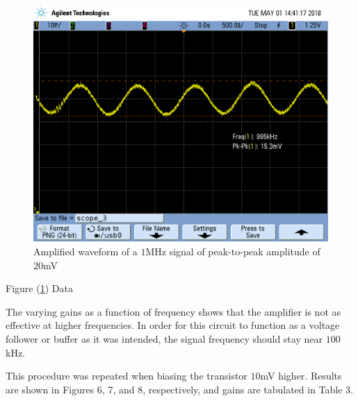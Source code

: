 \FloatBarrier

\begin{figure}[h!]
	\centering
	\includegraphics[scale=0.75]{./images/SCOPE_3.PNG}
	\caption{Amplified waveform of a $1$\si{\mega\hertz} signal of peak-to-peak amplitude of $20$\si{\milli\volt}}
	\label{fig:SCOPE_3}
\end{figure}

\FloatBarrier

\begin{table}[h!]
	\centering
	\caption{Figure (\ref{fig:SCOPE_3}) Data}
	\label{tab:gain_part1}
\end{table}

\FloatBarrier

The varying gains as a function of frequency shows that the amplifier is not as effective at higher frequencies. In order for this circuit to function as a voltage follower or buffer as it was intended, the signal frequency should stay near $100$\si{\kilo\hertz}.

This procedure was repeated when biasing the transistor $10$\si{\milli\volt} higher. Results are shown in Figures 6, 7, and 8, respectively, and gains are tabulated in Table 3.

\FloatBarrier

